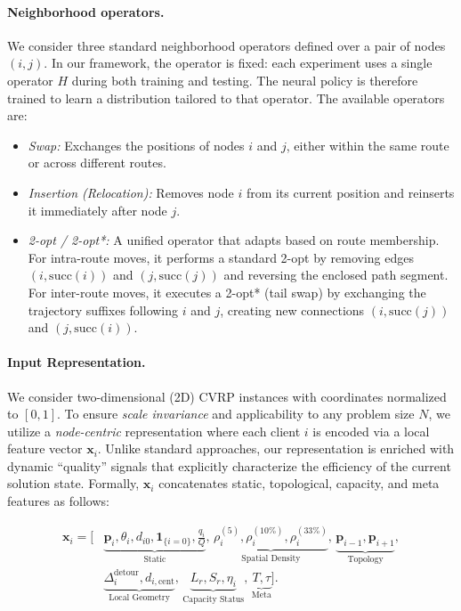 \documentclass[letterpaper]{article} %
\begin{document}
\paragraph{Neighborhood operators.}

We consider three standard neighborhood operators defined over a pair of nodes $(i, j)$. In our framework, the operator is fixed: each experiment uses a single operator $H$ during both training and testing. The neural policy is therefore trained to learn a distribution tailored to that operator. The available operators are:

\begin{itemize}
    \item \textit{Swap:} Exchanges the positions of nodes $i$ and $j$, either within the same route or across different routes.
    \item \textit{Insertion (Relocation):} Removes node $i$ from its current position and reinserts it immediately after node $j$.
    \item \textit{2-opt / 2-opt*:} A unified operator that adapts based on route membership. For intra-route moves, it performs a standard 2-opt by removing edges $(i, \text{succ}(i))$ and $(j, \text{succ}(j))$ and reversing the enclosed path segment. For inter-route moves, it executes a 2-opt* (tail swap) by exchanging the trajectory suffixes following $i$ and $j$, creating new connections $(i, \text{succ}(j))$ and $(j, \text{succ}(i))$.
\end{itemize}

\paragraph{Input Representation.}
We consider two-dimensional (2D) CVRP instances with coordinates normalized to $[0, 1]$. To ensure \textit{scale invariance} and applicability to any problem size $N$, we utilize a \textit{node-centric} representation where each client $i$ is encoded via a local feature vector $\mathbf{x}_i$. Unlike standard approaches, our representation is enriched with dynamic ``quality'' signals that explicitly characterize the efficiency of the current solution state. Formally, $\mathbf{x}_i$ concatenates static, topological, capacity, and meta features as follows:

\begin{equation*}
\begin{split}
    \mathbf{x}_i = \Big[
        & \underbrace{\mathbf{p}_i, \theta_i, d_{i0}, \mathbf{1}_{\{i=0\}}, \tfrac{q_i}{Q}}_{\text{Static}}, \,
          \underbrace{\rho^{(5)}_i, \rho^{(10\%)}_i, \rho^{(33\%)}_i}_{\text{Spatial Density}}, \,
          \underbrace{\mathbf{p}_{i-1}, \mathbf{p}_{i+1}}_{\text{Topology}}, \\
        & \underbrace{\Delta^{\text{detour}}_i, d_{i, \text{cent}}}_{\text{Local Geometry}}, \,
          \underbrace{L_{r}, S_{r}, \eta_i}_{\text{Capacity Status}}, \,
          \underbrace{T, \tau}_{\text{Meta}}
    \Big].
\end{split}
\end{equation*}
\end{document}
